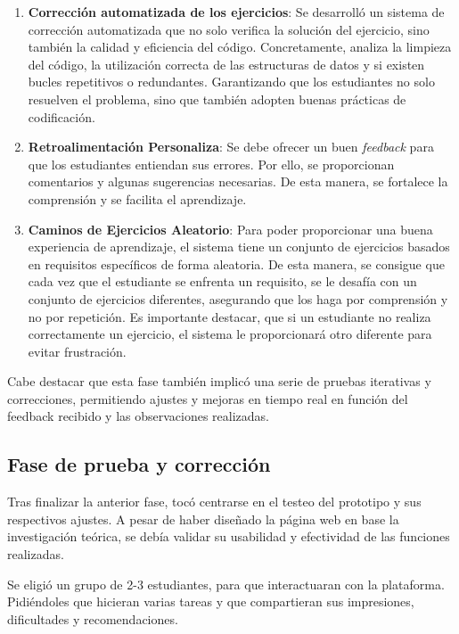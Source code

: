 \begin{enumerate}
    \item \textbf{Corrección automatizada de los ejercicios}: Se desarrolló un sistema de corrección automatizada que no solo verifica la solución del ejercicio, sino también la calidad y eficiencia del código. Concretamente, analiza la limpieza del código, la utilización correcta de las estructuras de datos y si existen bucles repetitivos o redundantes. Garantizando que los estudiantes no solo resuelven el problema, sino que también adopten buenas prácticas de codificación.

    \item \textbf{Retroalimentación Personaliza}: Se debe ofrecer un buen \textit{feedback} para que los estudiantes entiendan sus errores. Por ello, se proporcionan comentarios y algunas sugerencias necesarias. De esta manera, se fortalece la comprensión y se facilita el aprendizaje.

    \item \textbf{Caminos de Ejercicios Aleatorio}: Para poder proporcionar una buena experiencia de aprendizaje, el sistema tiene un conjunto de ejercicios basados en requisitos específicos de forma aleatoria. De esta manera, se consigue que cada vez que el estudiante se enfrenta un requisito, se le desafía con un conjunto de ejercicios diferentes, asegurando que los haga por comprensión y no por repetición. Es importante destacar, que si un estudiante no realiza correctamente un ejercicio, el sistema le proporcionará otro diferente para evitar frustración.
\end{enumerate}

Cabe destacar que esta fase también implicó una serie de pruebas iterativas y correcciones, permitiendo ajustes y mejoras en tiempo real en función del feedback recibido y las observaciones realizadas.

\subsection{Fase de prueba y corrección}

Tras finalizar la anterior fase, tocó centrarse en el testeo del prototipo y sus respectivos ajustes. A pesar de haber diseñado la página web en base la investigación teórica, se debía validar su usabilidad y efectividad de las funciones realizadas.

Se eligió un grupo de 2-3 estudiantes, para que interactuaran con la plataforma. 
Pidiéndoles que hicieran varias tareas y que compartieran sus impresiones, dificultades y recomendaciones.

